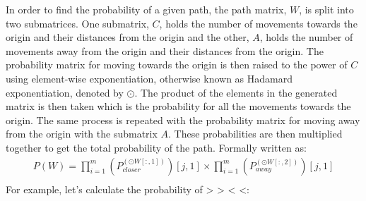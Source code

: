 \documentclass[letterpaper, 12pt]{report}
\begin{document}
In order to find the probability of a given path, the path matrix, $W$, is
split into two submatrices. One submatrix, $C$, holds the number of movements
towards the origin and their distances from the origin and the other, $A$,
holds the number of movements away from the origin and their distances from the
origin. The probability matrix for moving towards the origin is then raised to
the power of $C$ using element-wise exponentiation, otherwise known as Hadamard
exponentiation, denoted by $\odot$. The product of the elements in the
generated matrix is then taken which is the probability for all the movements
towards the origin. The same process is repeated with the probability matrix
for moving away from the origin with the submatrix $A$. These probabilities are
then multiplied together to get the total probability of the path. Formally
written as:
\begin{align*}
	P(W)=\prod_{i=1}^{m} \left(P_{closer}^{\left(\odot
		W
		[:,1]\right)} \right)
	[j, 1]
	\times
	\prod_{i=1}^{m} \left( P_{away} ^{\left(\odot
		W
		[:,2]\right)} \right)
	[j, 1]
	\\
\end{align*}
For example, let's calculate the probability of > > < <:
\end{document}

